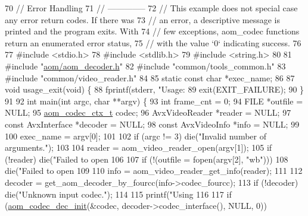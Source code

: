 \begin{DoxyCodeInclude}
70 \textcolor{comment}{// Error Handling}
71 \textcolor{comment}{// --------------}
72 \textcolor{comment}{// This example does not special case any error return codes. If there was}
73 \textcolor{comment}{// an error, a descriptive message is printed and the program exits. With}
74 \textcolor{comment}{// few exceptions, aom\_codec functions return an enumerated error status,}
75 \textcolor{comment}{// with the value `0` indicating success.}
76 
77 \textcolor{preprocessor}{#include <stdio.h>}
78 \textcolor{preprocessor}{#include <stdlib.h>}
79 \textcolor{preprocessor}{#include <string.h>}
80 
81 \textcolor{preprocessor}{#include "\hyperlink{aom__decoder_8h}{aom/aom\_decoder.h}"}
82 \textcolor{preprocessor}{#include "common/tools\_common.h"}
83 \textcolor{preprocessor}{#include "common/video\_reader.h"}
84 
85 \textcolor{keyword}{static} \textcolor{keyword}{const} \textcolor{keywordtype}{char} *exec\_name;
86 
87 \textcolor{keywordtype}{void} usage\_exit(\textcolor{keywordtype}{void}) \{
88   fprintf(stderr, \textcolor{stringliteral}{"Usage: %
89   exit(EXIT\_FAILURE);
90 \}
91 
92 \textcolor{keywordtype}{int} main(\textcolor{keywordtype}{int} argc, \textcolor{keywordtype}{char} **argv) \{
93   \textcolor{keywordtype}{int} frame\_cnt = 0;
94   FILE *outfile = NULL;
95   \hyperlink{structaom__codec__ctx}{aom\_codec\_ctx\_t} codec;
96   AvxVideoReader *reader = NULL;
97   \textcolor{keyword}{const} AvxInterface *decoder = NULL;
98   \textcolor{keyword}{const} AvxVideoInfo *info = NULL;
99 
100   exec\_name = argv[0];
101 
102   \textcolor{keywordflow}{if} (argc != 3) die(\textcolor{stringliteral}{"Invalid number of arguments."});
103 
104   reader = aom\_video\_reader\_open(argv[1]);
105   \textcolor{keywordflow}{if} (!reader) die(\textcolor{stringliteral}{"Failed to open %
106 
107   \textcolor{keywordflow}{if} (!(outfile = fopen(argv[2], \textcolor{stringliteral}{"wb"})))
108     die(\textcolor{stringliteral}{"Failed to open %
109 
110   info = aom\_video\_reader\_get\_info(reader);
111 
112   decoder = get\_aom\_decoder\_by\_fourcc(info->codec\_fourcc);
113   \textcolor{keywordflow}{if} (!decoder) die(\textcolor{stringliteral}{"Unknown input codec."});
114 
115   printf(\textcolor{stringliteral}{"Using %
116 
117   \textcolor{keywordflow}{if} (\hyperlink{group__decoder_gafdbfca65b19ab1f6d72b32cd01753b9b}{aom\_codec\_dec\_init}(&codec, decoder->codec\_interface(), NULL, 0))
}}}}
\end{DoxyCodeInclude}
